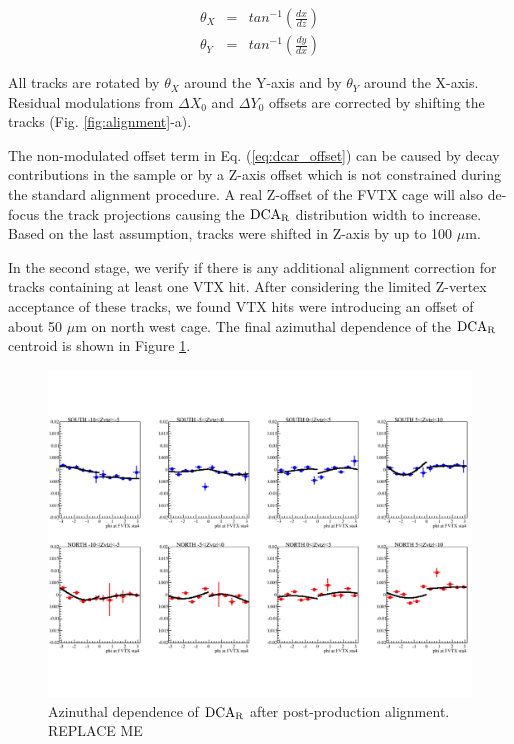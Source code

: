 \documentclass[12pt]{article}
\newcommand{\dcar}{$\rm{DCA}_{R}$ }
\begin{document}
\begin{eqnarray}
\theta_X &=& tan^{-1}\left(\frac{dx}{dz}\right)\\\nonumber
\theta_Y &=& tan^{-1}\left(\frac{dy}{dx}\right)
\end{eqnarray}

All tracks are rotated by $\theta_X$ around the Y-axis and by $\theta_Y$ around the X-axis. Residual modulations from $\Delta X_0$ and $\Delta Y_0$ offsets 
are corrected by shifting the tracks (Fig. \ref{fig:alignment}-a). 

The non-modulated offset term in Eq. (\ref{eq:dcar_offset}) can be caused by decay contributions in the sample or by a Z-axis offset which is not constrained 
during the standard alignment procedure. A real Z-offset of the FVTX cage will also de-focus the track projections causing the \dcar distribution 
width to increase. Based on the last assumption, tracks were shifted in Z-axis by up to 100 $\mu$m.

In the second stage, we verify if there is any additional alignment correction for tracks containing at least one VTX hit. After considering the limited Z-vertex 
acceptance of these tracks, we found VTX hits were introducing an offset of about 50 $\mu$m on north west cage. The final azimuthal dependence 
of the \dcar centroid is shown in Figure \ref{fig:dca_phi_after_alignment}. 

\begin{figure}
	\includegraphics[width=1.0\textwidth]{Figures/dca_phi_after_alignment}
	\caption{\label{fig:dca_phi_after_alignment}Azinuthal dependence of \dcar after post-production alignment.{\color{red} REPLACE ME}}
\end{figure}
\end{document}
